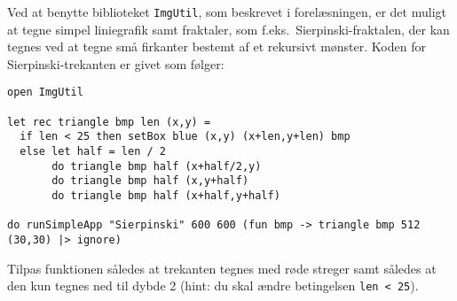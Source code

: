 \label{sierpinski.ov} Ved at benytte biblioteket \texttt{ImgUtil}, som beskrevet i
  forelæsningen, er det muligt at tegne simpel liniegrafik samt
  fraktaler, som f.eks.\ Sierpinski-fraktalen, der kan tegnes ved at
  tegne små firkanter bestemt af et rekursivt mønster. Koden for
  Sierpinski-trekanten er givet som følger:
\begin{lstlisting}[numbers=none,frame=none,mathescape]
open ImgUtil

let rec triangle bmp len (x,y) =
  if len < 25 then setBox blue (x,y) (x+len,y+len) bmp
  else let half = len / 2
       do triangle bmp half (x+half/2,y)
       do triangle bmp half (x,y+half)
       do triangle bmp half (x+half,y+half)

do runSimpleApp "Sierpinski" 600 600 (fun bmp -> triangle bmp 512 (30,30) |> ignore)
\end{lstlisting}

Tilpas funktionen således at trekanten tegnes med røde streger samt
således at den kun tegnes ned til dybde 2 (hint: du skal ændre betingelsen \lstinline{len < 25}).
